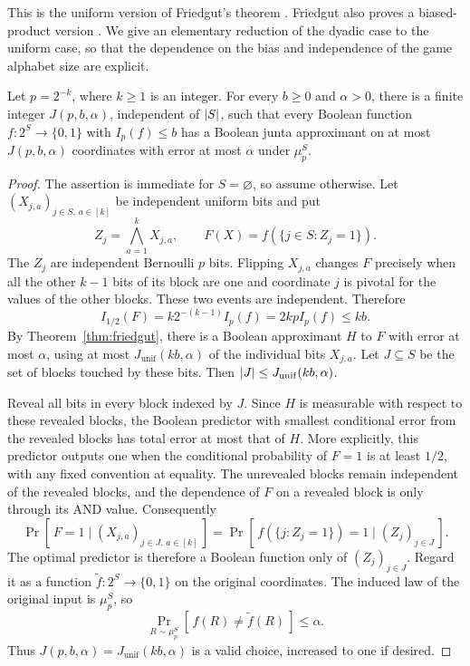 This is the uniform version of Friedgut's theorem
\cite[Theorem~1.1 in the February 3, 1998 author manuscript]{Friedgut1998}.
Friedgut also proves a biased-product version
\cite[Theorem~4.1 in the same manuscript]{Friedgut1998}.
We give an elementary reduction of the dyadic case to the uniform case,
so that the dependence on the bias and independence of the game
alphabet size are explicit.

\begin{corollary}
\label{cor:dyadic-junta}
Let \(p=2^{-k}\), where \(k\ge1\) is an integer.  For every \(b\ge0\)
and \(\alpha>0\), there is a finite integer \(J(p,b,\alpha)\),
independent of \(\lvert S\rvert\), such that every Boolean function
\(f:2^S\to\{0,1\}\) with \(I_p(f)\le b\) has a Boolean junta
approximant on at most \(J(p,b,\alpha)\) coordinates with error at
most \(\alpha\) under \(\mu_p^S\).
\end{corollary}

\begin{proof}
The assertion is immediate for \(S=\varnothing\), so assume otherwise.
Let \((X_{j,a})_{j\in S,\,a\in[k]}\) be independent uniform bits and
put
\[
  Z_j=\bigwedge_{a=1}^k X_{j,a},
  \qquad
  F(X)=f(\{j\in S:Z_j=1\}).
\]
The \(Z_j\) are independent Bernoulli \(p\) bits.  Flipping \(X_{j,a}\)
changes \(F\) precisely when all the other \(k-1\) bits of its block
are one and coordinate \(j\) is pivotal for the values of the other
blocks.  These two events are independent.  Therefore
\begin{equation}
\label{eq:and-block-influence}
  I_{1/2}(F)
   =k2^{-(k-1)}I_p(f)
   =2kpI_p(f)
   \le kb.
\end{equation}
By Theorem~\ref{thm:friedgut}, there is a Boolean approximant \(H\)
to \(F\) with error at most \(\alpha\), using at most
\(J_{\mathrm{unif}}(kb,\alpha)\) of the individual bits \(X_{j,a}\).
Let \(J\subseteq S\) be the set of blocks touched by these bits.
Then \(\lvert J\rvert\le J_{\mathrm{unif}}(kb,\alpha)\).

Reveal all bits in every block indexed by \(J\).  Since \(H\) is
measurable with respect to these revealed blocks, the Boolean
predictor with smallest conditional error from the revealed blocks
has total error at most that of \(H\).  More explicitly, this
predictor outputs one when the conditional probability of \(F=1\)
is at least \(1/2\), with any fixed convention at equality.
The unrevealed blocks remain independent of the revealed blocks,
and the dependence of \(F\) on a revealed block is only through its
AND value.  Consequently
\[
 \Pr[\,F=1\mid (X_{j,a})_{j\in J,\,a\in[k]}\,]
 =
 \Pr[\,f(\{j:Z_j=1\})=1\mid (Z_j)_{j\in J}\,].
\]
The optimal predictor is therefore a Boolean function only of
\((Z_j)_{j\in J}\).  Regard it as a function
\(\widetilde f:2^S\to\{0,1\}\) on the original coordinates.
The induced law of the original input is \(\mu_p^S\), so
\[
  \Pr_{R\sim\mu_p^S}[\,f(R)\ne\widetilde f(R)\,]\le\alpha.
\]
Thus \(J(p,b,\alpha)=J_{\mathrm{unif}}(kb,\alpha)\) is a valid
choice, increased to one if desired.
\end{proof}


